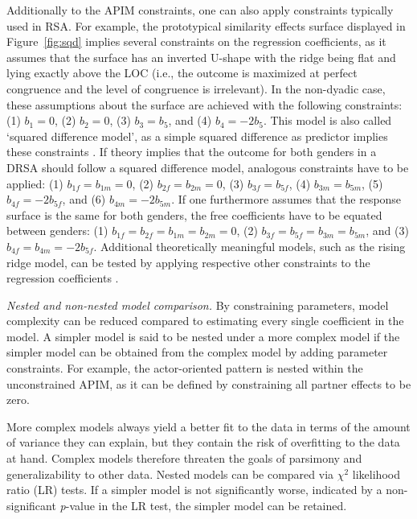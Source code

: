 \documentclass[jou,a4paper,draftfirst]{apa6}
\begin{document}
Additionally to the APIM constraints, one can also apply constraints typically used in RSA. For example, the prototypical similarity effects surface displayed in Figure~\ref{fig:sqd} implies several constraints on the regression coefficients, as it assumes that the surface has an inverted U-shape with the ridge being flat and lying exactly above the LOC (i.e., the outcome is maximized at perfect congruence and the level of congruence is irrelevant). In the non-dyadic case, these assumptions about the surface are achieved with the following constraints: (1) $b_1 = 0$, (2) $b_2 = 0$, (3) $b_3 = b_5$, and (4) $b_4 = -2 b_5$. This model is also called `squared difference model', as a simple squared difference as predictor implies these constraints \parencite{edwards_alternatives_2002,schonbrodt_testing_2015}. If theory implies that the outcome for both genders in a DRSA should follow a squared difference model, analogous constraints have to be applied: (1) $b_{1f} = b_{1m} = 0$, (2) $b_{2f} = b_{2m} = 0$, (3) $b_{3f} = b_{5f}$, (4) $b_{3m} = b_{5m}$, (5) $b_{4f} = -2 b_{5f}$, and (6) $b_{4m} = -2 b_{5m}$. If one furthermore assumes that the response surface is the same for both genders, the free coefficients have to be equated between genders: (1) $b_{1f} = b_{2f} = b_{1m} = b_{2m} = 0$, (2) $b_{3f} = b_{5f} = b_{3m} = b_{5m}$, and (3) $b_{4f} = b_{4m} = -2 b_{5f}$. Additional theoretically meaningful models, such as the rising ridge model, can be tested by applying respective other constraints to the regression coefficients \parencite{schonbrodt_testing_2015}.

\emph{Nested and non-nested model comparison.}
By constraining parameters, model complexity can be reduced compared to estimating every single coefficient in the model. A simpler model is said to be nested under a more complex model if the simpler model can be obtained from the complex model by adding parameter constraints. For example, the actor-oriented pattern is nested within the unconstrained APIM, as it can be defined by constraining all partner effects to be zero. 

More complex models always yield a better fit to the data in terms of the amount of variance they can explain, but they contain the risk of overfitting to the data at hand. Complex models therefore threaten the goals of parsimony and generalizability to other data. Nested models can be compared via $\chi^2$ likelihood ratio (LR) tests. If a simpler model is not significantly worse, indicated by a non-significant \emph{p}-value in the LR test, the simpler model can be retained.
 
\end{document}
